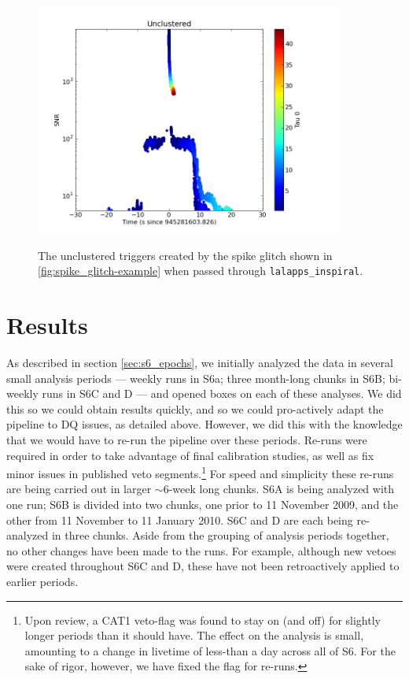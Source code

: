 \begin{figure}[hp]
\center
\includegraphics[width=4in]{figures/spike_glitch/L1_945281603.png}
\label{fig:spike_glitch-cbc_response}
\caption{The unclustered triggers created by the spike glitch shown in
\ref{fig:spike_glitch-example} when passed through \texttt{lalapps\_inspiral}.}
\end{figure}

\section{Results}

As described in section \ref{sec:s6_epochs}, we initially analyzed the data in
several small analysis periods --- weekly runs in S6a; three month-long chunks
in S6B; bi-weekly runs in S6C and D --- and opened boxes on each of these
analyses. We did this so we could obtain results quickly, and so we could
pro-actively adapt the pipeline to \ac{DQ} issues, as detailed above. However,
we did this with the knowledge that we would have to re-run the pipeline over
these periods. Re-runs were required in order to take advantage of final
calibration studies, as well as fix minor issues in published veto
segments.\footnote{Upon review, a CAT1 veto-flag was found to stay on (and off)
for slightly longer periods than it should have. The effect on the analysis is
small, amounting to a change in livetime of less-than a day across all of S6.
For the sake of rigor, however, we have fixed the flag for re-runs.} For speed
and simplicity these re-runs are being carried out in larger $\sim6$-week long
chunks.  S6A is being analyzed with one run; S6B is divided into two chunks,
one prior to 11 November 2009, and the other from 11 November to 11 January
2010. S6C and D are each being re-analyzed in three chunks. Aside from the
grouping of analysis periods together, no other changes have been made to the
runs. For example, although new vetoes were created throughout S6C and D, these
have not been retroactively applied to earlier periods.

